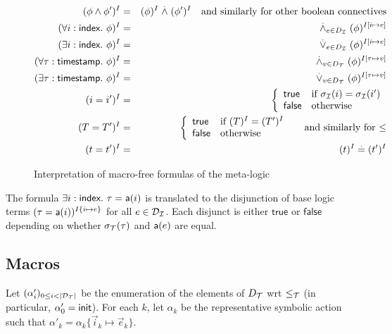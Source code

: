 \begin{figure}
  \begin{eqnarray*}
    (\phi\wedge\phi')^{I} &=& (\phi)^{I} \stackrel{.}{\wedge} (\phi')^{I}
    \quad \text{and similarly for other boolean connectives} \\
    (\forall i:\textsf{index}.~ \phi)^{I} &=&
    \stackrel{.}{\wedge}_{e\in D_{\mathcal{I}}} (\phi)^{I[i\mapsto e]} \\
    (\exists i:\textsf{index}.~ \phi)^{I} &=&
    \stackrel{.}{\vee}_{e\in D_{\mathcal{I}}} (\phi)^{I[i\mapsto e]} \\
    (\forall \tau:\textsf{timestamp}.~ \phi)^{I} &=&
    \stackrel{.}{\wedge}_{v\in D_{\mathcal{T}}} (\phi)^{I[\tau\mapsto v]} \\
    (\exists \tau:\textsf{timestamp}.~ \phi)^{I} &=&
    \stackrel{.}{\vee}_{v\in D_{\mathcal{T}}} (\phi)^{I[\tau\mapsto v]} \\
    (i=i')^{I} &=&
    \left\{\begin{array}{ll}
      \mathsf{true} & \text{if } \sigma_{\mathcal{I}}(i)=\sigma_{\mathcal{I}}(i') \\
      \mathsf{false} & \text{otherwise}
    \end{array}\right. \\
    (T = T')^{I} &=&
    \left\{\begin{array}{ll}
      \mathsf{true} & \text{if } (T)^{I} = (T')^{I} \\
      \mathsf{false} & \text{otherwise}
    \end{array}\right.
    \quad\text{ and similarly for $\leq$} \\
    (t=t')^{I} &=& (t)^{I} \stackrel{.}{=} (t')^{I}
  \end{eqnarray*}
  \caption{Interpretation of macro-free formulas of the meta-logic}
  \label{fig:interpf}
\end{figure}

\begin{example}
  The formula
  $\exists i:\textsf{index}.~ \tau = \textsf{a}(i)$
  is translated to the disjunction of base logic terms
  $(\tau = \textsf{a}(i))^{I\{i\mapsto e\}}$ for all $e \in \mathcal{D}_{\mathcal{I}}$.
  Each disjunct is either $\mathsf{true}$ or $\mathsf{false}$ depending on
  whether $\sigma_{\mathcal{T}}(\tau)$ and $\textsf{a}(e)$ are equal.
\end{example}

\subsection{Macros}

Let $(\alpha'_i)_{0 \leq i < |\mathcal{D}_{\mathcal{T}}|}$ be the enumeration of the elements
of $D_{\mathcal{T}}$ wrt $\leq_{\mathcal{T}}$ (in particular, $\alpha'_0 = \mathsf{init}$).
For each $k$, let $\alpha_k$ be the representative symbolic action
such that $\alpha'_k = \alpha_k\{\vec{i}_k\mapsto\vec{e}_k\}$.

